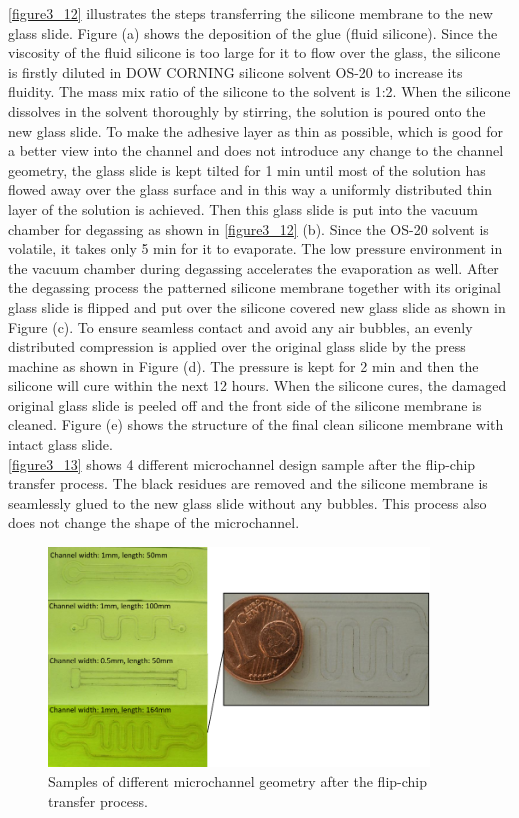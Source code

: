 \autoref{figure3_12} illustrates the steps transferring the silicone membrane to the new glass slide. Figure (a) shows the deposition of the glue (fluid silicone). Since the viscosity of the fluid silicone is too large for it to flow over the glass, the silicone is firstly diluted in DOW CORNING silicone solvent OS-20 \cite{os_20} to increase its fluidity. The mass mix ratio of the silicone to the solvent is 1:2. When the silicone dissolves in the solvent thoroughly by stirring, the solution is poured onto the new glass slide. To make the adhesive layer as thin as possible, which is good for a better view into the channel and does not introduce any change to the channel geometry, the glass slide is kept tilted for 1 min until most of the solution has flowed away over the glass surface and in this way a uniformly distributed thin layer of the solution is achieved. Then this glass slide is put into the vacuum chamber for degassing as shown in \autoref{figure3_12} (b). Since the OS-20 solvent is volatile, it takes only 5 min for it to evaporate. The low pressure environment in the vacuum chamber during degassing accelerates the evaporation as well. After the degassing process the patterned silicone membrane together with its original glass slide is flipped and put over the silicone covered new glass slide as shown in Figure (c). To ensure seamless contact and avoid any air bubbles, an evenly distributed compression is applied over the original glass slide by the press machine as shown in Figure (d). The pressure is kept for 2 min and then the silicone will cure within the next 12 hours. When the silicone cures, the damaged original glass slide is peeled off and the front side of the silicone membrane is cleaned. Figure (e) shows the structure of the final clean silicone membrane with intact glass slide.\\



\autoref{figure3_13} shows 4 different microchannel design sample after the flip-chip transfer process. The black residues are removed and the silicone membrane is seamlessly glued to the new glass slide without any bubbles. This process also does not change the shape of the microchannel.\\
\clearpage
\begin{figure}[h]%
\centering
\includegraphics[width=0.9\textwidth]{figures/designandfabrication/figure3_13}%
\caption{Samples of different microchannel geometry after the flip-chip transfer process.}%
\label{figure3_13}%
\end{figure}

